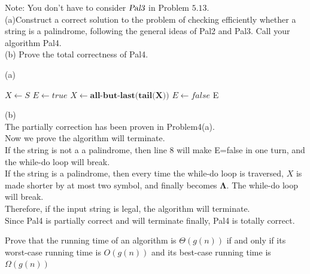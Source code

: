 \documentclass[a4paper, justified]{tufte-handout}
\begin{document}
\begin{problem}
Note: You don't have to consider $\textsl{Pal3}$ in Problem $5.13$.\\
(a)Construct a correct solution to the problem of checking efficiently whether a string is
a palindrome, following the general ideas of Pal2 and Pal3. Call your algorithm Pal4.\\
(b) Prove the total correctness of Pal4.\\
\end{problem}

\begin{solution}
  (a)\\
  \noindent
  \begin{algorithm}
    \begin{algorithmic}[1]
      \caption{judge whether the string is a palindrome}\label{euclid}
      \State $X\gets S$
      \State $E\gets true$
      \State $X\gets \textbf{all-but-last(tail(X))}$
      \Else
      \State $E\gets false$
      \EndIf
      \EndWhile
      \State\Return E
      \EndProcedure
    \end{algorithmic}
  \end{algorithm}

  \noindent(b)\\
  The partially correction has been proven in Problem4(a).\\
  Now we prove the algorithm will terminate.\\
  If the string is not a a palindrome, then line 8 will make E=false in one turn, and the while-do loop will break.\\
  If the string is a palindrome, then every time the while-do loop is traversed, $X$ is made shorter by at most two symbol, and finally becomes $\boldsymbol{\Lambda}$. The while-do loop will break. \\
  Therefore, if the input string is legal, the algorithm will terminate.\\
  Since Pal4 is partially correct and will terminate finally, Pal4 is totally correct.
\end{solution}

\begin{problem}[2-2.4 TC Exercise 3.1-6]
Prove that the running time of an algorithm is \(\Theta(g(n))\) if and only if its worst-case running time is \(O(g(n))\) and its best-case running time is \(\Omega(g(n))\)
\end{problem}
\end{document}
